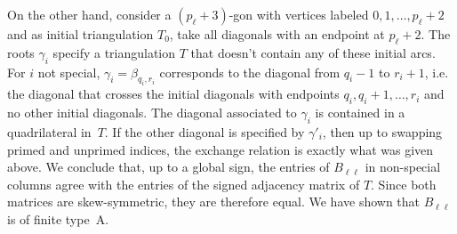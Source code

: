 \documentclass{amsart}
\newtheorem{lemma}[proposition]{Lemma}
\theoremstyle{definition}
\theoremstyle{remark}
\numberwithin{equation}{section}
\newcommand{\set}[1]{{\left\lbrace #1 \right\rbrace}}
\newcommand{\ck}{\spcheck}
\newcommand{\0}{{\mathbf{0}}}
\newcommand{\g}{\mathbf{g}}
\newcommand{\x}{\mathbf{x}}
\newcommand{\RSTChar}{\Upsilon}
\newcommand{\RST}[1]{\RSTChar^{#1}}
\begin{document}
On the other hand, consider a $(p_\ell+3)$-gon with vertices labeled $0,1,\ldots,p_\ell+2$ and as initial triangulation $T_0$, take all diagonals with an endpoint at $p_\ell+2$.
The roots $\gamma_i$ specify a triangulation $T$ that doesn't contain any of these initial arcs.
For $i$ not special, $\gamma_i=\beta_{q_i,r_i}$ corresponds to the diagonal from $q_i-1$ to $r_i+1$, i.e. the diagonal that crosses the initial diagonals with endpoints $q_i,q_i+1,\ldots,r_i$ and no other initial diagonals.  
The diagonal associated to $\gamma_i$ is contained in a quadrilateral in~$T$.
If the other diagonal is specified by $\gamma'_i$, then up to swapping primed and unprimed indices, the exchange relation is exactly what was given above.
We conclude that, up to a global sign, the entries of  $B_{\ell\ell}$ in non-special columns agree with the entries of the signed adjacency matrix of $T$.
Since both matrices are skew-symmetric, they are therefore equal.
We have shown that $B_{\ell\ell}$ is of finite type~A.

%
%
%
%
%
%
%
%
%
%
%
%
%
%
%
%
\end{document}

